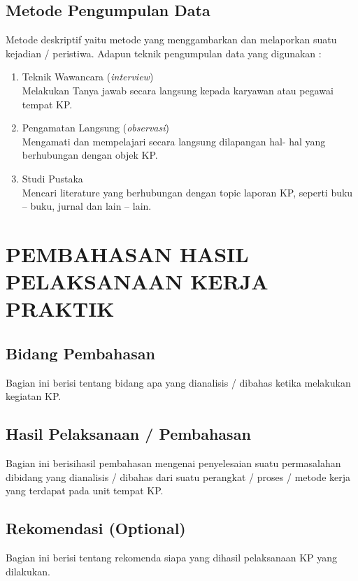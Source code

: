 \documentclass[oneside,listof=totoc]{scrbook}
\newcommand\tab[1][1cm]{\hspace*{#1}}
\begin{document}
\section{Metode Pengumpulan Data}
Metode deskriptif yaitu metode yang menggambarkan dan melaporkan suatu kejadian / peristiwa. Adapun teknik pengumpulan data yang digunakan :
\begin{enumerate}[label=\alph*.]
  \item Teknik Wawancara (\textit{interview})\\
    \tab[12pt] Melakukan Tanya jawab secara langsung kepada karyawan atau pegawai tempat KP.
  \item Pengamatan Langsung (\textit{observasi})\\
    \tab[12pt] Mengamati dan mempelajari secara langsung dilapangan hal- hal yang berhubungan dengan objek KP.
  \item Studi Pustaka\\
    \tab[12pt] Mencari literature yang berhubungan dengan topic laporan KP, seperti buku – buku, jurnal dan lain – lain.
\end{enumerate}

\chapter{PEMBAHASAN HASIL PELAKSANAAN KERJA PRAKTIK}

\vspace{0.5cm}

\section{Bidang Pembahasan}
Bagian ini berisi tentang bidang apa yang dianalisis / dibahas ketika melakukan kegiatan KP.

\section{Hasil Pelaksanaan / Pembahasan}
Bagian ini berisihasil pembahasan mengenai penyelesaian suatu permasalahan dibidang yang dianalisis / dibahas dari suatu perangkat / proses / metode kerja yang terdapat pada unit tempat KP.

\section{Rekomendasi (Optional)}
Bagian ini berisi tentang rekomenda siapa yang dihasil pelaksanaan KP yang dilakukan.
\end{document}
